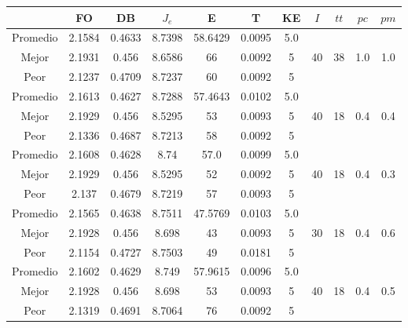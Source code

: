 \begin{table}[h!]
    \footnotesize
    \begin{center}
        \begin{tabular}{|c|c|c|c|c|c|c|c|c|c|c|}
        \hline
             & {\bf FO} & {\bf DB} & $J_e$ & {\bf E} & {\bf T} & {\bf KE} & $I$ & $tt$ & $pc$ & $pm$ \\
        \hline
        \hline
            Promedio  & 2.1584 & 0.4633 & 8.7398 & 58.6429 & 0.0095 & 5.0 &  &  &  & \\
            \cline{1-7}
            Mejor & 2.1931 & 0.456  & 8.6586 & 66 & 0.0092 & 5 & 40 & 38 & 1.0 & 1.0\\
            \cline{1-7}
            Peor & 2.1237 & 0.4709  & 8.7237 & 60 & 0.0092 & 5 &  &  &  & \\
        \hline
        \hline
            Promedio  & 2.1613 & 0.4627 & 8.7288 & 57.4643 & 0.0102 & 5.0 &  &  &  & \\
            \cline{1-7}
            Mejor & 2.1929 & 0.456  & 8.5295 & 53 & 0.0093 & 5 & 40 & 18 & 0.4 & 0.4\\
            \cline{1-7}
            Peor & 2.1336 & 0.4687  & 8.7213 & 58 & 0.0092 & 5 &  &  &  & \\
        \hline
        \hline
            Promedio  & 2.1608 & 0.4628 & 8.74 & 57.0 & 0.0099 & 5.0 &  &  &  & \\
            \cline{1-7}
            Mejor & 2.1929 & 0.456  & 8.5295 & 52 & 0.0092 & 5 & 40 & 18 & 0.4 & 0.3\\
            \cline{1-7}
            Peor & 2.137 & 0.4679  & 8.7219 & 57 & 0.0093 & 5 &  &  &  & \\
        \hline
        \hline
            Promedio  & 2.1565 & 0.4638 & 8.7511 & 47.5769 & 0.0103 & 5.0 &  &  &  & \\
            \cline{1-7}
            Mejor & 2.1928 & 0.456  & 8.698 & 43 & 0.0093 & 5 & 30 & 18 & 0.4 & 0.6\\
            \cline{1-7}
            Peor & 2.1154 & 0.4727  & 8.7503 & 49 & 0.0181 & 5 &  &  &  & \\
        \hline
        \hline
            Promedio  & 2.1602 & 0.4629 & 8.749 & 57.9615 & 0.0096 & 5.0 &  &  &  & \\
            \cline{1-7}
            Mejor & 2.1928 & 0.456  & 8.698 & 53 & 0.0093 & 5 & 40 & 18 & 0.4 & 0.5\\
            \cline{1-7}
            Peor & 2.1319 & 0.4691  & 8.7064 & 76 & 0.0092 & 5 &  &  &  & \\

\end{tabular}
\end{center}
\end{table}
